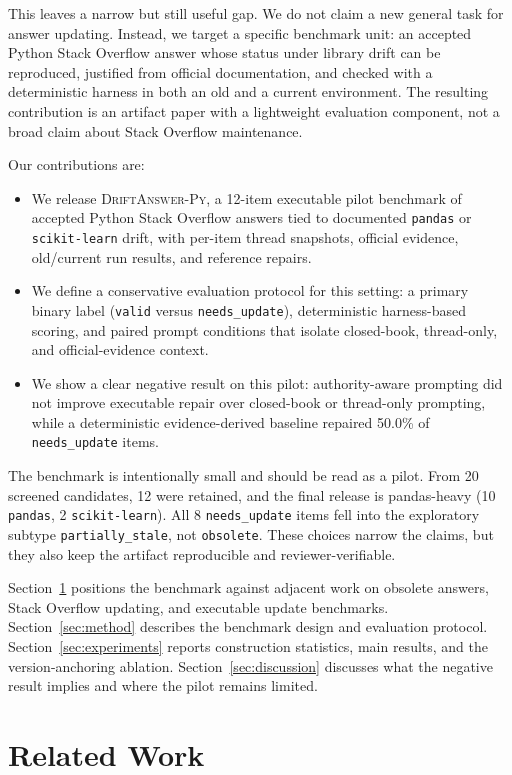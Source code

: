 \documentclass{article}
\newcommand{\dataset}{\textsc{DriftAnswer-Py}}
\newcommand{\valid}{\texttt{valid}}
\newcommand{\needsupdate}{\texttt{needs\_update}}
\begin{document}
This leaves a narrow but still useful gap. We do not claim a new general task for answer updating. Instead, we target a specific benchmark unit: an accepted Python Stack Overflow answer whose status under library drift can be reproduced, justified from official documentation, and checked with a deterministic harness in both an old and a current environment. The resulting contribution is an artifact paper with a lightweight evaluation component, not a broad claim about Stack Overflow maintenance.

Our contributions are:
\begin{itemize}[leftmargin=1.5em]
  \item We release \dataset, a 12-item executable pilot benchmark of accepted Python Stack Overflow answers tied to documented \texttt{pandas} or \texttt{scikit-learn} drift, with per-item thread snapshots, official evidence, old/current run results, and reference repairs.
  \item We define a conservative evaluation protocol for this setting: a primary binary label (\valid{} versus \needsupdate{}), deterministic harness-based scoring, and paired prompt conditions that isolate closed-book, thread-only, and official-evidence context.
  \item We show a clear negative result on this pilot: authority-aware prompting did not improve executable repair over closed-book or thread-only prompting, while a deterministic evidence-derived baseline repaired 50.0\% of \needsupdate{} items.
\end{itemize}

The benchmark is intentionally small and should be read as a pilot. From 20 screened candidates, 12 were retained, and the final release is pandas-heavy (10 \texttt{pandas}, 2 \texttt{scikit-learn}). All 8 \needsupdate{} items fell into the exploratory subtype \texttt{partially\_stale}, not \texttt{obsolete}. These choices narrow the claims, but they also keep the artifact reproducible and reviewer-verifiable.

Section~\ref{sec:related} positions the benchmark against adjacent work on obsolete answers, Stack Overflow updating, and executable update benchmarks. Section~\ref{sec:method} describes the benchmark design and evaluation protocol. Section~\ref{sec:experiments} reports construction statistics, main results, and the version-anchoring ablation. Section~\ref{sec:discussion} discusses what the negative result implies and where the pilot remains limited.

\section{Related Work}
\label{sec:related}
\end{document}
